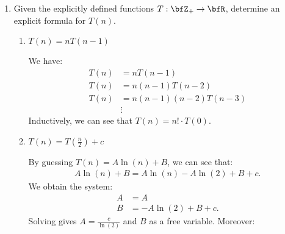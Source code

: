 \documentclass[11pt,twoside,openany]{memoir}
\begin{document}
\begin{enumerate}[label = (\roman*),itemsep=1pt,topsep=3pt]
        \item Given the explicitly defined functions $T:\bfZ_+ \rightarrow \bfR$, determine an explicit formula for $T(n)$.
        \begin{enumerate}[label = (\Alph*),itemsep=4pt,topsep=4pt]
            \item $T(n) = n T(n-1)$
                \vspace{5pt}
                \begin{solution}
                    We have:
                        \begin{equation*}
                        \begin{split}
                            T(n) &= nT(n-1) \\
                            T(n) &= n(n-1)T(n-2) \\
                            T(n) &= n(n-1)(n-2)T(n-3) \\
                            &\vdots
                        \end{split}
                        \end{equation*}
                    Inductively, we can see that $T(n) = n!\cdot T(0)$.
                \end{solution}
                \vspace{5pt}
            \item $T(n) = T(\frac{n}{2}) + c$
                \vspace{5pt}
                \begin{solution}
                    By guessing $T(n) = A\ln(n) + B$, we can see that:
                        \begin{equation*}
                        \begin{split}
                            A\ln(n) + B = A\ln(n) - A\ln(2) + B + c.
                        \end{split}
                        \end{equation*} 
                    We obtain the system:
                        \begin{equation*}
                        \begin{split}
                            A &= A \\
                            B &= -A\ln(2) + B + c.
                        \end{split}
                        \end{equation*}
                    Solving gives $A = \frac{c}{\ln(2)}$ and $B$ as a free variable. Moreover:

\end{solution}
\end{enumerate}
\end{enumerate}
\end{document}
